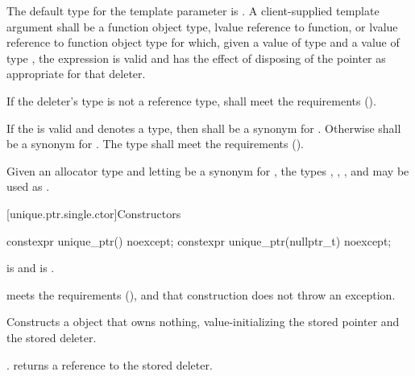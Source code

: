 \pnum
The default type for the template parameter  is
. A client-supplied template argument
 shall be a function
object type, lvalue reference to function, or
lvalue reference to function object type
for which, given
a value  of type  and a value
 of type , the expression
 is valid and has the effect of disposing of the
pointer as appropriate for that deleter.

\pnum
If the deleter's type  is not a reference type,  shall meet
the  requirements ().

\pnum
If the   is valid and denotes a
type, then  shall be a synonym for . Otherwise
 shall be a synonym for . The type  shall
meet the  requirements ().

\pnum
\begin{example}
Given an allocator type  and
letting  be a synonym for , the types ,
, , and 
may be used as .
\end{example}

[unique.ptr.single.ctor]{Constructors}

%
\begin{itemdecl}
constexpr unique_ptr() noexcept;
constexpr unique_ptr(nullptr_t) noexcept;
\end{itemdecl}

\begin{itemdescr}
\pnum
\constraints
{} is  and
 is .

\pnum
\expects
{} meets the  requirements (),
and that construction does not throw an exception.

\pnum
\effects
Constructs a  object that owns
nothing, value-initializing the stored pointer and the stored deleter.

\pnum
\ensures
{}. 
returns a reference to the stored deleter.
\end{itemdescr}

